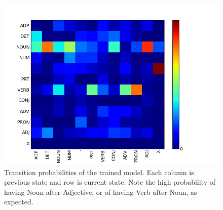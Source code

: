 \begin{figure}
\centering
\includegraphics[scale=.5]{figs/sequences/transition_probs}
\caption{\label{fig:transProbs} Transition probabilities of the
trained model. Each column is previous state and row is current
state. Note the high probability of having Noun after Adjective, or of having Verb after Noun, as expected.}
\end{figure}

